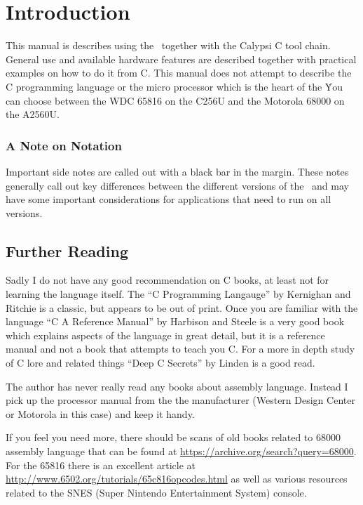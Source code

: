 \chapter{Introduction}

This manual is describes using the \foenix\ together with the Calypsi C
tool chain. General use and available hardware features are described
together with practical examples on how to do it from C.
This manual does not attempt to describe the C programming language or
the micro processor which is the heart of the \foenix\. You can choose
between the WDC 65816 on the C256U and the Motorola 68000 on the A2560U.

\subsection*{A Note on Notation}

Important side notes are called out with a black bar in the
margin. These notes generally call out key differences between the
different versions of the \foenix\ and may have some important
considerations for applications that need to run on all versions.

\section*{Further Reading}

Sadly I do not have any good recommendation on C books, at least not
for learning the language itself. The ``C Programming Langauge'' by
Kernighan and Ritchie is a classic, but appears to be out of print.
Once you are familiar with the language ``C A Reference Manual'' by
Harbison and Steele is a very good book which explains aspects of the
language in great detail, but it is a reference manual and not a book
that attempts to teach you C.
For a more in depth study of C lore and related things ``Deep C
Secrets'' by Linden is a good read.

The author has never really read any books about assembly
language. Instead I pick up the processor manual from the the
manufacturer (Western Design Center or Motorola in this case) and keep
it handy.

If you feel you need more, there should be scans of old books related
to 68000 assembly language that can be found at
\url{https://archive.org/search?query=68000}.
For the 65816 there is an excellent article at
\url{http://www.6502.org/tutorials/65c816opcodes.html} as well as
various resources related to the SNES (Super Nintendo Entertainment
System) console.

